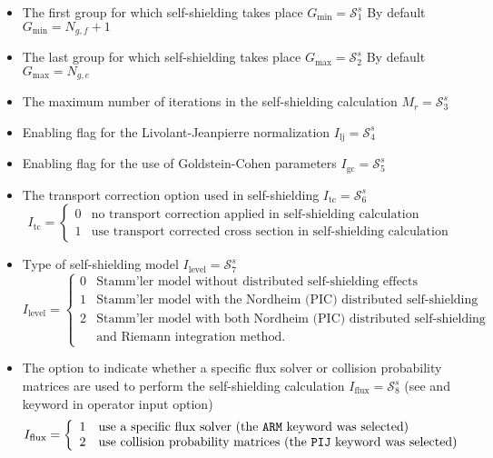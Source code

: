 \begin{itemize}
\item The first group for which self-shielding takes place $G_{\mathrm{min}}=\mathcal{S}^{s}_{1}$
       By default $G_{\mathrm{min}}=N_{g,f}+1$

\item The last group for which self-shielding takes place $G_{\mathrm{max}}=\mathcal{S}^{s}_{2}$
       By default $G_{\mathrm{max}}=N_{g,e}$

\item The maximum number of iterations in the self-shielding calculation $M_{r}=\mathcal{S}^{s}_{3}$ 
       
\item Enabling flag for the Livolant-Jeanpierre normalization $I_{\mathrm{lj}}=\mathcal{S}^{s}_{4}$ 
       
\item Enabling flag for the use of Goldstein-Cohen parameters $I_{\mathrm{gc}}=\mathcal{S}^{s}_{5}$ 

\item The transport correction option used in self-shielding $I_{\mathrm{tc}}=\mathcal{S}^{s}_{6}$ 
\begin{displaymath}
I_{\mathrm{tc}} = \left\{
\begin{array}{ll}
0 & \textrm{no transport correction applied in self-shielding calculation} \\
1 & \textrm{use transport corrected cross section in self-shielding calculation}
\end{array} \right.
\end{displaymath}

\item Type of self-shielding model $I_{\mathrm{level}}=\mathcal{S}^{s}_{7}$ 
\begin{displaymath}
I_{\mathrm{level}} = \left\{
\begin{array}{ll}
0 & \textrm{Stamm'ler model without distributed self-shielding effects} \\
1 & \textrm{Stamm'ler model with the Nordheim (PIC) distributed self-shielding model} \\
2 & \textrm{Stamm'ler model with both Nordheim (PIC) distributed self-shielding model} \\
  & \textrm{and Riemann integration method.}
\end{array} \right.
\end{displaymath}

\item The option to indicate whether a specific flux solver or collision probability matrices
are used to perform the self-shielding calculation $I_{\mathrm{flux}}=\mathcal{S}^{s}_{8}$
(see  and  keyword in  operator input option)
\begin{displaymath}
I_{\mathrm{flux}} = \left\{
\begin{array}{rl}
 1 & \textrm{use a specific flux solver (the \moc{ARM} keyword was selected)} \\
 2 & \textrm{use collision probability matrices (the \moc{PIJ} keyword was selected)}
\end{array} \right.
\end{displaymath}


\end{itemize}
